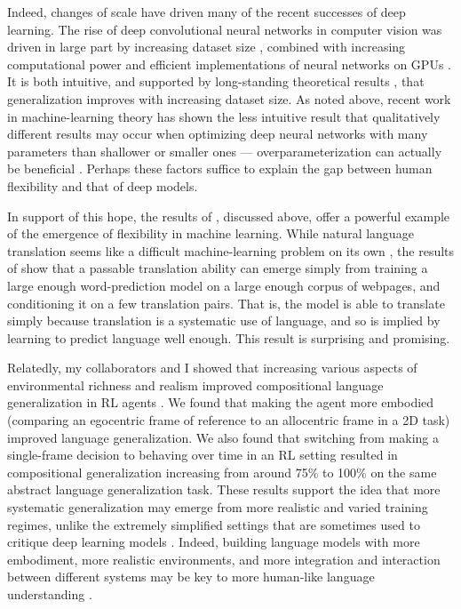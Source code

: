 Indeed, changes of scale have driven many of the recent successes of deep learning. The rise of deep convolutional neural networks in computer vision was driven in large part by increasing dataset size \citep{Deng2009}, combined with increasing computational power and efficient implementations of neural networks on GPUs \citep{Krizhevsky2012}. It is both intuitive, and supported by long-standing theoretical results \citep{Bartlett2002}, that generalization improves with increasing dataset size. As noted above, recent work in machine-learning theory has shown the less intuitive result that qualitatively different results may occur when optimizing deep neural networks with many parameters than shallower or smaller ones --- overparameterization can actually be beneficial \citep{Dauphin2014, Arora2018a}. Perhaps these factors suffice to explain the gap between human flexibility and that of deep models.\par 
In support of this hope, the results of \citet{Radford2019}, discussed above, offer a powerful example of the emergence of flexibility in machine learning. While natural language translation seems like a difficult machine-learning problem on its own \citep{Wu2016}, the results of \citet{Radford2019} show that a passable translation ability can emerge simply from training a large enough word-prediction model on a large enough corpus of webpages, and conditioning it on a few translation pairs. That is, the model is able to translate simply because translation is a systematic use of language, and so is implied by learning to predict language well enough. This result is surprising and promising. \par 
Relatedly, my collaborators and I showed that increasing various aspects of environmental richness and realism improved compositional language generalization in RL agents \citep{Hill2019a}. We found that making the agent more embodied (comparing an egocentric frame of reference to an allocentric frame in a 2D task) improved language generalization. We also found that switching from making a single-frame decision to behaving over time in an RL setting resulted in compositional generalization increasing from around 75\% to 100\% on the same abstract language generalization task. These results support the idea that more systematic generalization may emerge from more realistic and varied training regimes, unlike the extremely simplified settings that are sometimes used to critique deep learning models \citep[see e.g.][]{Lake2017}. Indeed, building language models with more embodiment, more realistic environments, and more integration and interaction between different systems may be key to more human-like language understanding \citep{McClelland2019}.\par
